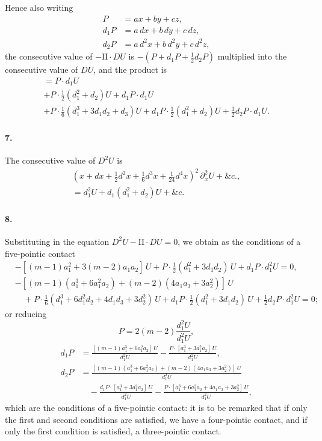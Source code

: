 \documentclass[12pt,a4paper]{article}
\theoremstyle{plain}
\begin{document}
\newpage

Hence  also  writing
\begin{align*}
P &= ax + by + cz, \\
d_1 P &= a\, dx + b\, dy + c\, dz, \\
d_2 P &= a\, d^2x + b\, d^2y + c\, d^2z,
\end{align*}
the   consecutive   value   of  $-\mathrm{II} \cdot DU$  is   $-(P + d_1 P + \tfrac{1}{2}d_2 P)$  multiplied   into   the  consecutive
value  of  $DU$,  and  the  product  is
\begin{multline*}
= P \cdot d_1 U \\
+ P \cdot \tfrac{1}{2}(d_1^2 + d_2) U + d_1 P \cdot d_1 U \\
+ P \cdot \tfrac{1}{6}(d_1^3 + 3d_1 d_2 + d_3) U + d_1 P \cdot \tfrac{1}{2}(d_1^2 + d_2) U + \tfrac{1}{2}d_2 P \cdot d_1 U.
\end{multline*}

\paragraph{7.}
The  consecutive  value  of  $D^2 U$  is
\begin{multline*}
(x + dx + \tfrac{1}{2}d^2x + \tfrac{1}{6}d^3x + \tfrac{1}{24}d^4x)^2 \, \partial_x^2 U + \&c., \\
= d_1^2 U + d_1(d_1^2 + d_2) U + \&c.
\end{multline*}


\paragraph{8.}
Substituting   in  the  equation  $D^2 U - \mathrm{II} \cdot DU = 0$,  we   obtain   as   the   conditions  of
a  five-pointic  contact
\begin{align*}
&-[(m-1)a_1^2 + 3(m-2)a_1 a_2] \, U + P \cdot \tfrac{1}{2}(d_1^2 + 3d_1 d_2) \, U + d_1 P \cdot d_1^2 U = 0, \\
&-[(m-1)(a_1^3 + 6a_1^2 a_2) + (m-2)(4a_1 a_3 + 3a_2^2)] \, U \\
&\quad + P \cdot \tfrac{1}{6}(d_1^3 + 6d_1^2 d_2 + 4d_1 d_3 + 3d_2^2) \, U + d_1 P \cdot \tfrac{1}{2}(d_1^2 + 3d_1 d_2) \, U + \tfrac{1}{2}d_2 P \cdot d_1^2 U = 0;
\end{align*}
or  reducing
\[
P = 2(m-2) \frac{d_1^2 U}{d_1^2 U},
\]
\begin{align*}
d_1 P &= \frac{[(m-1)a_1^3 + 6a_1^2 a_2] \, U}{d_1^2 U} - \frac{P \cdot [a_1^3 + 3a_1^2 a_2] \, U}{d_1^2 U}, \\
d_2 P &= \frac{[(m-1)(a_1^3 + 6a_1^2 a_2) + (m-2)(4a_1 a_3 + 3a_2^2)] \, U}{d_1^2 U} \\
&\quad - \frac{d_1 P \cdot [a_1^3 + 3a_1^2 a_2] \, U}{d_1^2 U} - \frac{P \cdot [a_1^3 + 6a_1^2 a_2 + 4a_1 a_3 + 3a_2^2] \, U}{d_1^2 U},
\end{align*}
which  are  the  conditions  of  a  five-pointic  contact:  it  is  to  be  remarked  that  if  only
the  first  and  second  conditions  are  satisfied,  we  have  a  four-pointic  contact,  and  if  only
the  first  condition  is  satisfied,  a  three-pointic  contact.
\end{document}
